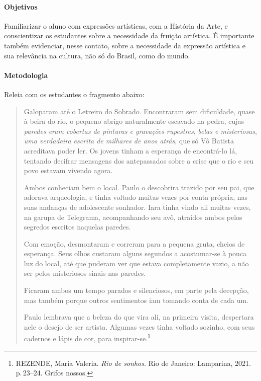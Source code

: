 \documentclass[12pt]{extarticle}
\begin{document}
\paragraph{Objetivos}
Familiarizar o aluno com expressões artísticas, com a História da
Arte, e conscientizar os estudantes sobre a necessidade da fruição
artística. É importante também evidenciar, nesse contato, sobre a
necessidade da expressão artística e sua relevância na cultura, não só
do Brasil, como do mundo.

\paragraph{Metodologia}
Releia com os estudantes o fragmento abaixo:

\begin{quote}
  Galoparam até o Letreiro do Sobrado. Encontraram sem dificuldade,
  quase à beira do rio, o pequeno abrigo naturalmente escavado na pedra,
  cujas \emph{paredes eram cobertas de pinturas e gravações rupestres},
  \emph{belas e misteriosas}, \emph{uma verdadeira escrita de milhares
  de anos atrás}, que só Vô Batista acreditava poder ler. Os jovens
  tinham a esperança de encontrá-lo lá, tentando decifrar mensagens dos
  antepassados sobre a crise que o rio e seu povo estavam vivendo agora.

  Ambos conheciam bem o local. Paulo o descobrira trazido por seu pai,
  que adorava arqueologia, e tinha voltado muitas vezes por conta
  própria, nas suas andanças de adolescente sonhador. Iara tinha vindo
  ali muitas vezes, na garupa de Telegrama, acompanhando seu avô,
  atraídos ambos pelos segredos escritos naquelas paredes.

  Com emoção, desmontaram e correram para a pequena gruta, cheios de
  esperança. Seus olhos custaram alguns segundos a acostumar-se à pouca
  luz do local, até que puderam ver que estava completamente vazio, a
  não ser pelos misteriosos sinais nas paredes.

  Ficaram ambos um tempo parados e silenciosos, em parte pela decepção,
  mas também porque outros sentimentos iam tomando conta de cada um.

  Paulo lembrava que a beleza do que vira ali, na primeira visita,
  despertara nele o desejo de ser artista. Algumas vezes tinha voltado
  sozinho, com seus cadernos e lápis de cor, para inspirar-se.\footnote{REZENDE, Maria Valeria. \emph{Rio de sonhos}. Rio de Janeiro: Lamparina, 2021. p.\,23--24. Grifos nossos.}
\end{quote}
\end{document}
